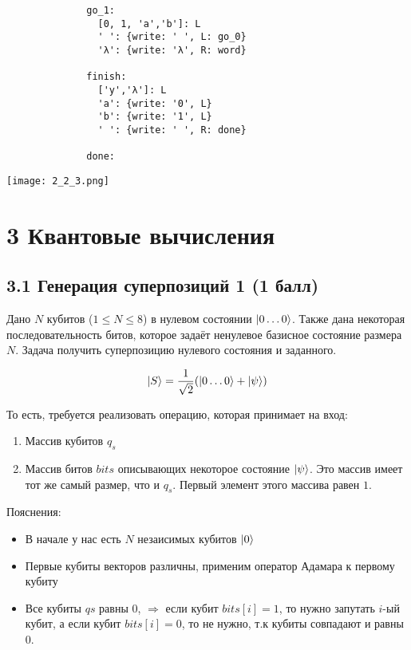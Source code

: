 \documentclass{article}
\DeclarePairedDelimiter\ket{\lvert}{\rangle}
\begin{document}
\begin{enumerate}
\begin{verbatim}
              go_1:
                [0, 1, 'a','b']: L
                ' ': {write: ' ', L: go_0}
                'λ': {write: 'λ', R: word}
              
              finish:
                ['y','λ']: L
                'a': {write: '0', L}
                'b': {write: '1', L}
                ' ': {write: ' ', R: done}
                
              done:

        \end{verbatim}
        \begin{center}
            \texttt{[image: 2\_2\_3.png]} \\
        \end{center}
\end{enumerate}


\section*{3 Квантовые вычисления}
\subsection*{3.1 Генерация суперпозиций 1 (1 балл)}
    Дано $N$ кубитов ($1 \le N \le 8$) в нулевом состоянии $\ket{0\dots0}$. 
    Также дана некоторая последовательность битов, которое задаёт ненулевое базисное состояние размера $N$. Задача получить суперпозицию нулевого состояния и заданного.
    
    $$\ket{S} = \frac{1}{\sqrt2}(\ket{0\dots0} +\ket{\psi})$$
    
    То есть, требуется реализовать операцию, которая принимает на вход:
    \begin{enumerate}
        \item Массив кубитов $q_s$
        \item Массив битов $bits$ описывающих некоторое состояние $\ket{\psi}$. Это массив имеет тот же самый размер, что и $q_s$. Первый элемент этого массива равен $1$.
    \end{enumerate}
    
    Пояснения:
        
    \begin{itemize}
        \item В начале у нас есть $N$ незаисимых кубитов $\ket{0}$
        \item Первые кубиты векторов различны, применим оператор Адамара к первому кубиту
        \item Все кубиты $qs$ равны 0, $\Rightarrow$ если кубит $bits[i] = 1$, то нужно запутать $i$-ый кубит, а если кубит $bits[i] = 0$, то не нужно, т.к кубиты совпадают и равны 0.

    \end{itemize}
    
\end{document}
